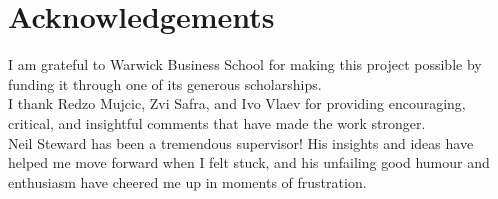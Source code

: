 
\chapter*{Acknowledgements}%
\label{cha:acknowledgements}

I am grateful to Warwick Business School for making this project possible by funding it through one of its generous scholarships.\\

\noindent I thank Redzo Mujcic, Zvi Safra, and Ivo Vlaev for providing encouraging, critical, and insightful comments that have made the work stronger.\\

\noindent Neil Steward has been a tremendous supervisor! His insights and ideas have
helped me move forward when I felt stuck, and his unfailing good humour and
enthusiasm have cheered me up in moments of frustration.
